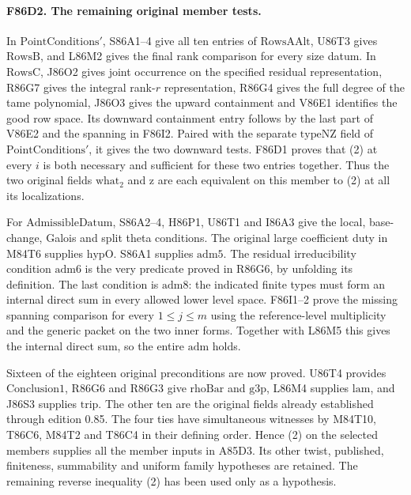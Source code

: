 \paragraph{F86D2. The remaining original member tests.}
In $\mathrm{PointConditions}'$, S86A1--4 give all ten entries of
$\mathrm{RowsAAlt}$, U86T3 gives $\mathrm{RowsB}$, and L86M2 gives
the final rank comparison for every size datum. In $\mathrm{RowsC}$,
J86O2 gives joint occurrence on the specified residual representation,
R86G7 gives the integral rank-$r$ representation, R86G4 gives the
full degree of the tame polynomial, J86O3 gives the upward containment
and V86E1 identifies the good row space. Its downward containment entry follows by the last part of V86E2
and the spanning in F86I2. Paired with the separate $\mathrm{typeNZ}$
field of $\mathrm{PointConditions}'$, it gives the two downward tests. F86D1 proves that (2) at every
$i$ is both necessary and sufficient for these two entries together.
Thus the two original fields $\mathrm{what}_2$ and $\mathrm z$ are
each equivalent on this member to (2) at all its localizations.

For $\mathrm{AdmissibleDatum}$, S86A2--4, H86P1, U86T1 and I86A3
give the local, base-change, Galois and split theta conditions.
The original large coefficient duty in M84T6 supplies
$\mathrm{hypO}$. S86A1 supplies $\mathrm{adm5}$.
The residual irreducibility condition $\mathrm{adm6}$ is the very
predicate proved in R86G6, by unfolding its definition. The last
condition is $\mathrm{adm8}$: the indicated finite types must form
an internal direct sum in every allowed lower level space.
F86I1--2 prove the missing spanning comparison for every
$1\le j\le m$ using the reference-level multiplicity and the
generic packet on the two inner forms. Together with L86M5 this
gives the internal direct sum, so the entire $\mathrm{adm}$ holds.

Sixteen of the eighteen original preconditions are now proved.
U86T4 provides
$\mathrm{Conclusion1}$, R86G6 and R86G3 give $\mathrm{rhoBar}$ and
$\mathrm{g3p}$, L86M4 supplies $\mathrm{lam}$, and J86S3 supplies
$\mathrm{trip}$. The other ten are the original fields already
established through edition 0.85. The four ties have simultaneous
witnesses by M84T10, T86C6, M84T2 and T86C4 in their defining order.
Hence (2) on the selected members supplies all the member
inputs in A85D3. Its other twist, published, finiteness, summability
and uniform family hypotheses are retained. The remaining reverse inequality (2) has been used only as a hypothesis.
